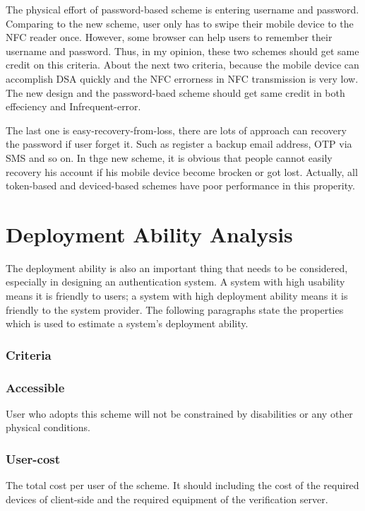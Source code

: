 \begin{CJK}{Bg5}{bsmi}
The physical effort of password-based scheme is entering username and password. Comparing to the new scheme, user only has to swipe their mobile device to the NFC reader once. However, some browser can help users to remember their username and password. Thus, in my opinion, these two schemes should get same credit on this criteria. About the next two criteria, because the mobile device can accomplish DSA quickly and the NFC errorness in NFC transmission is very low. The new design and the password-baed scheme should get same credit in both effeciency and Infrequent-error.

The last one is easy-recovery-from-loss, there are lots of approach can recovery the password if user forget it. Such as register a backup email address, OTP via SMS and so on. In thge new scheme, it is obvious that people cannot easily recovery his account if his mobile device become brocken or got lost. Actually, all token-based and deviced-based schemes have poor performance in this properity.

\section{Deployment Ability Analysis}

The deployment ability is also an important thing that needs to be considered, especially in designing an authentication system. A system with high usability means it is friendly to users; a system with high deployment ability means it is friendly to the system provider. The following paragraphs state the properties which is used to estimate a system's deployment ability.

\subsubsection{Criteria}

\subsubsection{Accessible}

User who adopts this scheme will not be constrained by disabilities or any other physical conditions.

\subsubsection{User-cost}

The total cost per user of the scheme. It should including the cost of the required devices of client-side and the required equipment of the verification server.


\end{CJK}
